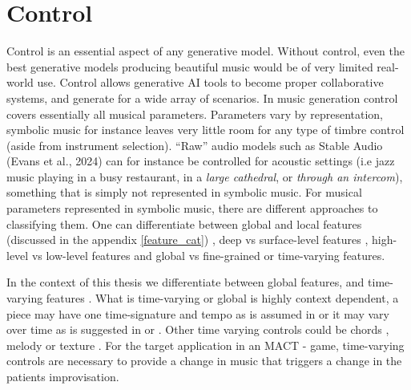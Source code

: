 \section{Control} \label{section:control}
Control is an essential aspect of any generative model. Without control, even the best generative models producing beautiful music would be of very limited real-world use. Control allows generative AI tools to become proper collaborative systems, and generate for a wide array of scenarios. In music generation control covers essentially all musical parameters. Parameters vary by representation, symbolic music for instance leaves very little room for any type of timbre control (aside from instrument selection). 
“Raw” audio models such as Stable Audio (Evans et al., 2024) can for instance be controlled for acoustic settings (i.e jazz music playing in a busy restaurant, in a \textit{large cathedral}, or \textit{through an intercom}), something that is simply not represented in symbolic music. 
For musical parameters represented in symbolic music, there are different approaches to classifying them. 
One can differentiate between global and local features (discussed in the appendix \ref{feature_cat}) \cite{Van_Kranenburg_Volk_Wiering_2013}, 
deep vs surface-level features \cite{Blacking_1971}, high-level vs low-level features \cite{Tan_Herremans_2020} and global vs fine-grained or time-varying features. 

In the context of this thesis we differentiate between global features, and time-varying features \cite{Rütte_figaro_2023}. What is time-varying or global is highly context dependent, a piece may have one time-signature and tempo as is assumed in \cite{Lu_Xu_Kang_Yu_Xing_Tan_Bian_MuseCoco_2023} or it may vary over time as is suggested in \cite{Rütte_figaro_2023} or \cite{Huang_Yang_remi_pop_transformer_2020}. Other time varying controls could be chords \cite{Rütte_figaro_2023}\cite{Wu_Donahue_musicontrolnet_2023}\cite{Lan_Hsiao_Cheng_Yang_musicongen_2024}\cite{Min_Jiang_Xia_Zhao_polyffusion_2023}, melody \cite{copet2023simple}\cite{Min_Jiang_Xia_Zhao_polyffusion_2023} or texture \cite{Min_Jiang_Xia_Zhao_polyffusion_2023}. For the target application in an MACT - game, time-varying controls are necessary to provide a change in music that triggers a change in the patients improvisation.


